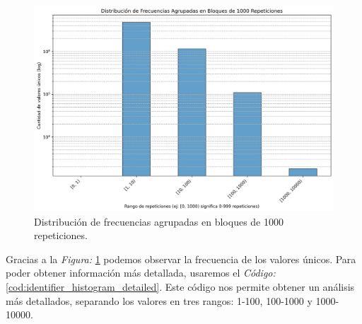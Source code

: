 \begin{figure}[H]
    \centering
    \includegraphics[scale=0.5]{img/histograma_frecuencias_agrupadas_1000.png}
    \caption{Distribución de frecuencias agrupadas en bloques de 1000 repeticiones.}
    \label{fig:identifier_histogram}
\end{figure}

\noindent Gracias a la \textit{Figura:} \ref{fig:identifier_histogram} podemos observar la frecuencia de los valores únicos. Para poder obtener información más detallada, usaremos el \textit{Código:} \ref{cod:identifier_histogram_detailed}. Este código nos permite obtener un análisis más detallados, separando los valores en tres rangos: 1-100, 100-1000 y 1000-10000.  

